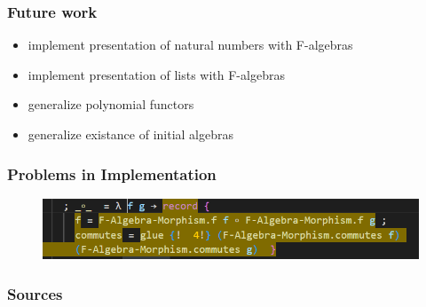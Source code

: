 \documentclass{beamer}
\begin{document}
\begin{frame}
\frametitle{Future work}
\begin{itemize}
\item implement presentation of natural numbers with F-algebras
\item implement presentation of lists with F-algebras
\item generalize polynomial functors
\item generalize existance of initial algebras
\end{itemize}


\end{frame}
\begin{frame}
\frametitle{Problems in Implementation}

\pause

\begin{figure}[h]
\includegraphics[width=12cm]{yellow.PNG}
\end{figure}


\end{frame}

\begin{frame}
  \frametitle{Sources}
  \nocite{*}
  \printbibliography
\end{frame}



\end{document}
